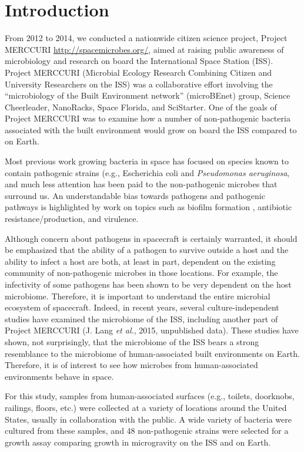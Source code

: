 \section{Introduction}

From 2012 to 2014, we conducted a nationwide citizen science project, Project MERCCURI \url{http://spacemicrobes.org/}, aimed at raising public awareness of microbiology and research on board the International Space Station (ISS). Project MERCCURI (Microbial Ecology Research Combining Citizen and University Researchers on the ISS) was a collaborative effort involving the ``microbiology of the Built Environment network'' (microBEnet) group, Science Cheerleader, NanoRacks, Space Florida, and SciStarter. One of the goals of Project MERCCURI was to examine how a number of non-pathogenic bacteria associated with the built environment would grow on board the ISS compared to on Earth.

Most previous work growing bacteria in space has focused on species known to contain pathogenic strains (e.g., Escherichia coli \cite{klaus_investigation_1997, brown_effects_2002} and {\em Pseudomonas aeruginosa}, \cite{crabbe_transcriptional_2011, kim_effect_2013} and much less attention has been paid to the non-pathogenic microbes that surround us. An understandable bias towards pathogens and pathogenic pathways is highlighted by work on topics such as biofilm formation \cite{kim_spaceflight_2013, mclean_bacterial_2001}, antibiotic resistance/production, \cite{benoit_microbial_2006, juergensmeyer_long-term_1999, lam_effect_2002, klaus_antibiotic_2006}  and virulence. \cite{nickerson_microgravity_2000, hammond_effects_2013}

Although concern about pathogens in spacecraft is certainly warranted, it should be emphasized that the ability of a pathogen to survive outside a host and the ability to infect a host are both, at least in part, dependent on the existing community of non-pathogenic microbes in those locations. For example, the infectivity of some pathogens has been shown to be very dependent on the host microbiome. \cite{schuijt_gut_2016, ichinohe_microbiota_2011, van_rensburg_human_2015, reeves_interplay_2011} Therefore, it is important to understand the entire microbial ecosystem of spacecraft. Indeed, in recent years, several culture-independent studies have examined the microbiome of the ISS, \cite{castro_microbial_2004,  venkateswaran_international_2014, moissl_molecular_2007} including another part of Project MERCCURI (J. Lang {\em et al.}, 2015, unpublished data). These studies have shown, not surprisingly, that the microbiome of the ISS bears a strong resemblance to the microbiome of human-associated built environments on Earth. Therefore, it is of interest to see how microbes from human-associated environments behave in space.

For this study, samples from human-associated surfaces (e.g., toilets, doorknobs, railings, floors, etc.) were collected at a variety of locations around the United States, usually in collaboration with the public. A wide variety of bacteria were cultured from these samples, and 48 non-pathogenic strains were selected for a growth assay comparing growth in microgravity on the ISS and on Earth.